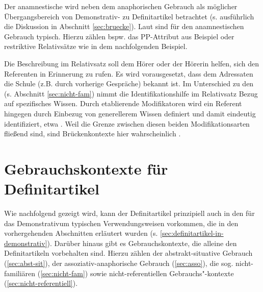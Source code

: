 \begin{exe}
	\ex \label{ex:kinder}    
\end{exe}

Der anamnestische wird neben dem anaphorischen Gebrauch als möglicher Übergangsbereich von Demonstrativ- zu Definitartikel betrachtet (s. ausführlich die Diskussion in Abschnitt \ref{sec:bruecke}). Laut \textcite[73]{Himmelmann1997} sind für den anamnestischen Gebrauch  typisch. Hierzu zählen bspw. das PP-Attribut  aus Beispiel  oder restriktive Relativsätze wie in dem nachfolgenden Beispiel.

\begin{exe}
	\ex \label{ex:film}     
\end{exe}
\noindent 
Die Beschreibung im Relativsatz soll dem Hörer oder der Hörerin helfen, sich den Referenten in Erinnerung zu rufen. Es wird vorausgesetzt, dass dem Adressaten die Schule (z.B. durch vorherige Gespräche) bekannt ist. Im Unterschied zu den  (s. Abschnitt \ref{sec:nicht-fam}) nimmt die Identifikationshilfe im Relativsatz Bezug auf spezifisches Wissen. Durch etablierende Modifikatoren wird ein Referent hingegen durch Einbezug von generellerem Wissen  definiert und damit eindeutig identifiziert, etwa . Weil die Grenze zwischen diesen beiden Modifikationsarten fließend sind, sind Brückenkontexte hier wahrscheinlich \parencite[s. zur ausführlichen Diskussion][79-80]{Himmelmann1997}. 

\section{Gebrauchskontexte für Definitartikel}\label{sec:definitartikel}

Wie nachfolgend gezeigt wird, kann der Definitartikel prinzipiell auch in den für das Demonstrativum typischen Verwendungsweisen vorkommen, die in den vorhergehenden Abschnitten erläutert wurden (s. \ref{sec:definitartikel-in-demonstrativ}). Darüber hinaus gibt es Gebrauchskontexte, die alleine den Definitartikeln vorbehalten sind. Hierzu zählen der abstrakt-situative Gebrauch (\ref{sec:abst-sit}), der assoziativ-anaphorische Gebrauch (\ref{sec:asso}), die sog. nicht-familiären (\ref{sec:nicht-fam}) sowie nicht-referentiellen Gebrauchs"-kontexte (\ref{sec:nicht-referentiell}). 

